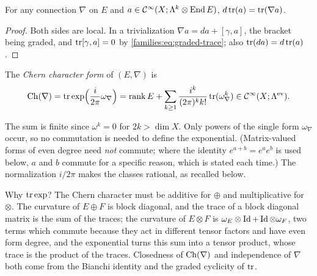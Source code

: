 \begin{lemma}\label{families:lem:dtr}
  For any connection $\nabla$ on $E$ and $a\in\mathcal{C}^\infty(X;\Lambda^k\otimes\operatorname{End} E)$,
  $d\operatorname{tr}(a)=\operatorname{tr}(\nabla a)$.
\end{lemma}
\begin{proof}
  Both sides are local. In a trivialization $\nabla a=da+[\gamma,a]$, the
  bracket being graded, and $\operatorname{tr}[\gamma,a]=0$ by
  \eqref{families:eq:graded-trace}; also $\operatorname{tr}(da)=d\operatorname{tr}(a)$.
\end{proof}

\begin{definition}\label{families:def:chern-form}
  The \emph{Chern character form} of $(E,\nabla)$ is
  \begin{equation*}
    \operatorname{Ch}(\nabla)=\operatorname{tr}\exp\Bigl(\frac{i}{2\pi}\omega_\nabla\Bigr)
    =\operatorname{rank}E+\sum_{k\ge1}\frac{i^k}{(2\pi)^kk!}\operatorname{tr}(\omega_\nabla^k)
    \in\mathcal{C}^\infty(X;\Lambda^{\mathrm{ev}}).
  \end{equation*}
\end{definition}
The sum is finite since $\omega^k=0$ for $2k>\dim X$. Only powers of the
single form $\omega_\nabla$ occur, so no commutation is needed to define the
exponential. (Matrix-valued forms of even degree need \emph{not} commute; where
the identity $e^{a+b}=e^ae^b$ is used below, $a$ and $b$ commute for a specific
reason, which is stated each time.) The normalization $i/2\pi$ makes the classes
rational, as recalled below.

\begin{discussion}
  Why $\operatorname{tr}\exp$? The Chern character must be additive for $\oplus$ and
  multiplicative for $\otimes$. The curvature of $E\oplus F$ is block diagonal,
  and the trace of a block diagonal matrix is the sum of the traces; the curvature
  of $E\otimes F$ is $\omega_E\otimes\operatorname{Id}+\operatorname{Id}\otimes\omega_F$, two terms which
  commute because they act in different tensor factors and have even form
  degree, and the exponential turns this sum into a tensor product, whose trace is the
  product of the traces. Closedness of $\operatorname{Ch}(\nabla)$ and independence of $\nabla$
  both come from the Bianchi identity and the graded cyclicity of $\operatorname{tr}$.
\end{discussion}

